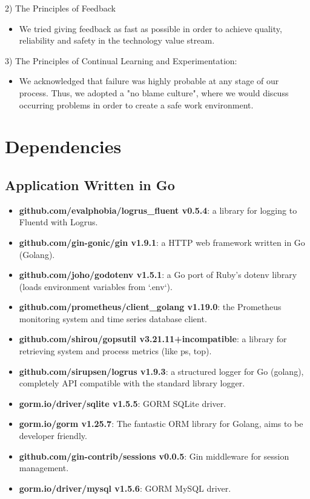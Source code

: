 \documentclass{article}
\begin{document}
2) The Principles of Feedback
\begin{itemize}
    \item We tried giving feedback as fast as possible in order to achieve quality, reliability and safety in the technology value stream.
\end{itemize}

3) The Principles of Continual Learning and Experimentation: 
\begin{itemize}
    \item We acknowledged that failure was highly probable at any stage of our process. Thus, we adopted a "no blame culture", where we would discuss occurring problems in order to create a safe work environment.
\end{itemize}

\clearpage
\section{Dependencies}

\subsection*{Application Written in Go}
\begin{itemize}
    \item \textbf{github.com/evalphobia/logrus\_fluent v0.5.4}: a library for logging to Fluentd with Logrus.
    \item \textbf{github.com/gin-gonic/gin v1.9.1}: a HTTP web framework written in Go (Golang).
    \item \textbf{github.com/joho/godotenv v1.5.1}: a Go port of Ruby's dotenv library (loads environment variables from `.env`).
    \item \textbf{github.com/prometheus/client\_golang v1.19.0}: the Prometheus monitoring system and time series database client.
    \item \textbf{github.com/shirou/gopsutil v3.21.11+incompatible}: a library for retrieving system and process metrics (like ps, top).
    \item \textbf{github.com/sirupsen/logrus v1.9.3}: a structured logger for Go (golang), completely API compatible with the standard library logger.
    \item \textbf{gorm.io/driver/sqlite v1.5.5}: GORM SQLite driver.
    \item \textbf{gorm.io/gorm v1.25.7}: The fantastic ORM library for Golang, aims to be developer friendly.
    \item \textbf{github.com/gin-contrib/sessions v0.0.5}: Gin middleware for session management.
    \item \textbf{gorm.io/driver/mysql v1.5.6}: GORM MySQL driver.
\end{itemize}
\end{document}
